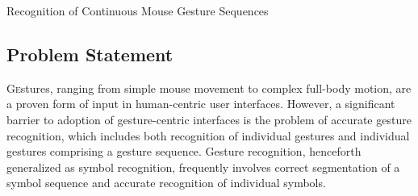 \documentclass[twoside]{article}
\begin{document}
\centerline{Recognition of Continuous Mouse Gesture Sequences}
\normalsize


\begin{multicols}{2} %

\section{Problem Statement}


\lettrine[nindent=0em,lines=2]{G}estures, ranging from simple mouse movement to
complex full-body motion\cite{mitra_gesture_2007}, are a proven form of input in
human-centric user interfaces. However, a significant barrier to adoption of
gesture-centric interfaces is the problem of accurate gesture recognition, which
includes both recognition of individual gestures and individual gestures
comprising a gesture sequence.
Gesture recognition, henceforth generalized as symbol recognition, frequently involves
correct segmentation of a symbol sequence and accurate recognition of individual
symbols.




\end{multicols}
\end{document}
